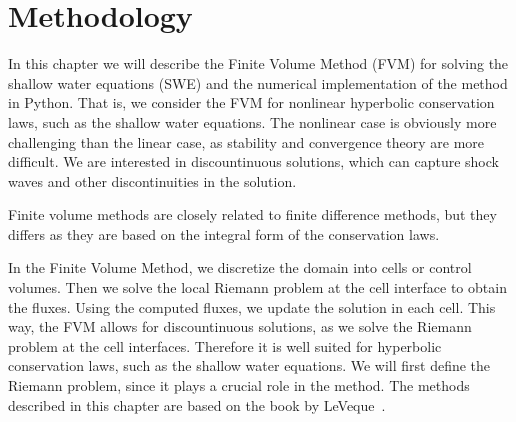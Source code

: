\chapter{Methodology}
In this chapter we will describe the Finite Volume Method (FVM) for solving the shallow water equations (SWE) and the numerical implementation of the method in Python.
That is, we consider the FVM for nonlinear hyperbolic conservation laws, such as the shallow water equations.
The nonlinear case is obviously more challenging than the linear case, as stability and convergence theory are more difficult.
We are interested in discountinuous solutions, which can capture shock waves and other discontinuities in the solution.

Finite volume methods are closely related to finite difference methods, but they differs as they are based on the integral form of the conservation laws.

In the Finite Volume Method, we discretize the domain into cells or control volumes.
Then we solve the local Riemann problem at the cell interface to obtain the fluxes.
Using the computed fluxes, we update the solution in each cell.
This way, the FVM allows for discountinuous solutions, as we solve the Riemann problem at the cell interfaces.
Therefore it is well suited for hyperbolic conservation laws, such as the shallow water equations.
We will first define the Riemann problem, since it plays a crucial role in the method.
The methods described in this chapter are based on the book by LeVeque~\cite{LeVeque2002}.










